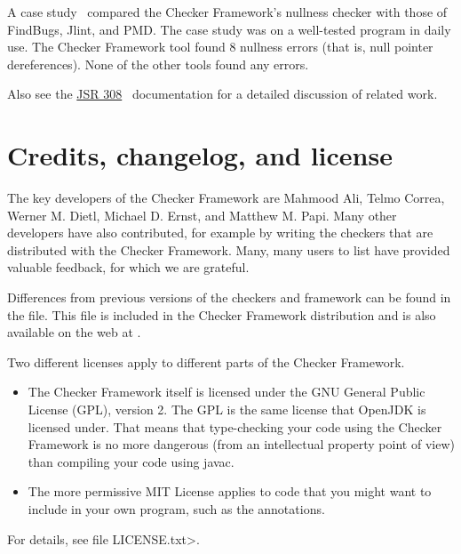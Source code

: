 A case study~\cite[\S6]{PapiACPE2008} compared the Checker Framework's nullness
checker with those of FindBugs, Jlint, and PMD\@.  The case study was on a
well-tested program in daily use.  The Checker Framework tool found 8
nullness errors (that is, null pointer dereferences).  None of the other
tools found any errors.

Also see the
\href{http://types.cs.washington.edu/jsr308/}{JSR 308}~\cite{JSR308-2008-09-12}
documentation for a detailed discussion of related work.



\section{Credits, changelog, and license\label{credits}}

The key developers of the Checker Framework are Mahmood Ali, Telmo Correa,
Werner M. Dietl, Michael D. Ernst, and Matthew M. Papi.
Many other developers have also contributed, for example by writing
the checkers that are distributed with the Checker Framework.
Many, many users to list have provided valuable feedback, for which we are
grateful.


Differences from previous versions of the checkers and framework can be found
in the  file.  This file is included in the
Checker Framework distribution and is also available on the web at
.

Two different licenses apply to different parts of the Checker Framework.
\begin{itemize}
\item
The Checker Framework itself is licensed under the GNU General Public License
(GPL), version 2.  The GPL is the same license that OpenJDK is licensed
under.  That means that type-checking your code using the Checker Framework
is no more dangerous (from an intellectual property point of view) than
compiling your code using javac.
\item
The more permissive MIT License applies
to code that you might want to include in your own
program, such as the annotations.
\end{itemize}
\noindent
For details, see file \<LICENSE.txt>.



